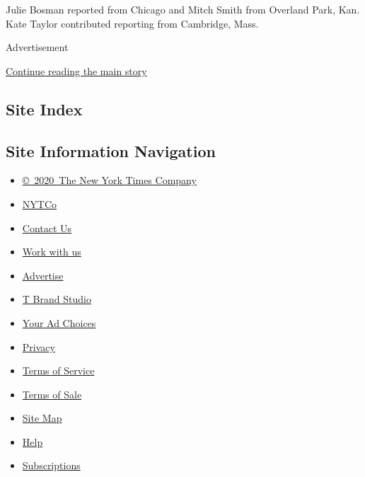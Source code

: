 Julie Bosman reported from Chicago and Mitch Smith from Overland Park,
Kan. Kate Taylor contributed reporting from Cambridge, Mass.

Advertisement

\protect\hyperlink{after-bottom}{Continue reading the main story}

\hypertarget{site-index}{%
\subsection{Site Index}\label{site-index}}

\hypertarget{site-information-navigation}{%
\subsection{Site Information
Navigation}\label{site-information-navigation}}

\begin{itemize}
\tightlist
\item
  \href{https://help.nytimes3xbfgragh.onion/hc/en-us/articles/115014792127-Copyright-notice}{©~2020~The
  New York Times Company}
\end{itemize}

\begin{itemize}
\tightlist
\item
  \href{https://www.nytco.com/}{NYTCo}
\item
  \href{https://help.nytimes3xbfgragh.onion/hc/en-us/articles/115015385887-Contact-Us}{Contact
  Us}
\item
  \href{https://www.nytco.com/careers/}{Work with us}
\item
  \href{https://nytmediakit.com/}{Advertise}
\item
  \href{http://www.tbrandstudio.com/}{T Brand Studio}
\item
  \href{https://www.nytimes3xbfgragh.onion/privacy/cookie-policy\#how-do-i-manage-trackers}{Your
  Ad Choices}
\item
  \href{https://www.nytimes3xbfgragh.onion/privacy}{Privacy}
\item
  \href{https://help.nytimes3xbfgragh.onion/hc/en-us/articles/115014893428-Terms-of-service}{Terms
  of Service}
\item
  \href{https://help.nytimes3xbfgragh.onion/hc/en-us/articles/115014893968-Terms-of-sale}{Terms
  of Sale}
\item
  \href{https://spiderbites.nytimes3xbfgragh.onion}{Site Map}
\item
  \href{https://help.nytimes3xbfgragh.onion/hc/en-us}{Help}
\item
  \href{https://www.nytimes3xbfgragh.onion/subscription?campaignId=37WXW}{Subscriptions}
\end{itemize}
